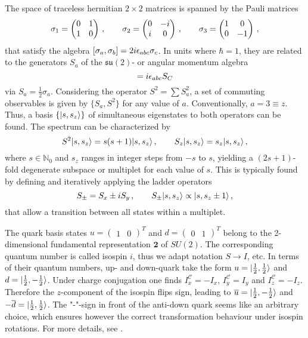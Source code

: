 The space of traceless hermitian $2\times 2$ matrices is spanned by the Pauli matrices
\begin{equation}
    \sigma_1=\begin{pmatrix}
        0&1\\1&0
    \end{pmatrix}\,,\qquad
    \sigma_2=\begin{pmatrix}
        0&-{i}\\{i}&0
    \end{pmatrix}\,,\qquad
    \sigma_3=\begin{pmatrix}
    1&0\\0&-1
    \end{pmatrix}\,,
\end{equation}
that satisfy the algebra ${[\sigma_a,\sigma_b]=2{i}\epsilon_{abc}\sigma_c}$. In units where ${\hbar=1}$, they are related to the generators $S_a$ of the $\mathfrak{su}(2)$- or angular momentum algebra
\begin{equation}
    [S_a,S_b]=\imagu\epsilon_{abc}S_C
\end{equation}
via ${S_a=\frac{1}{2}\sigma_a}$. Considering the operator ${S^2=\sum S_a^2}$, a set of commuting observables is given by ${\{S_a,S^2\}}$ for any value of $a$. Conventionally, ${a=3\equiv z}$. Thus, a basis ${\{{\lvert s,s_z\rangle}\}}$ of simultaneous eigenstates to both operators can be found. The spectrum can be characterized by
\begin{equation}
    S^2{\lvert s,s_z\rangle}=s(s+1){\lvert s,s_z\rangle}\,,\qquad S_z{\lvert s,s_z\rangle}=s_z{\lvert s,s_z\rangle}\,,
\end{equation}
where $s\in\mathbb{N}_0$ and $s_z$ ranges in integer steps from $-s$ to $s$, yielding a ${(2s+1)}$-fold degenerate subspace or multiplet for each value of $s$. This is typically found by defining and iteratively applying the ladder operators
\begin{equation}
    S_\pm=S_x\pm{i} S_y\,,\qquad S_\pm{\lvert s,s_z\rangle}\propto{\lvert s,s_z\pm 1\rangle}\,,
\end{equation}
that allow a transition between all states within a multiplet.

The quark basis states ${u=\begin{pmatrix}1&0\end{pmatrix}^T}$ and ${d=\begin{pmatrix}0&1\end{pmatrix}^T}$ belong to the 2-dimensional fundamental representation $\mathbf{2}$ of $SU(2)$. The corresponding quantum number is called isospin $i$, thus we adapt notation ${S\to I}$, etc. In terms of their quantum numbers, up- and down-quark take the form ${u={\lvert\frac{1}{2},\frac{1}{2}\rangle}}$ and ${d={\lvert\frac{1}{2},-\frac{1}{2}\rangle}}$. Under charge conjugation one finds ${I^\mathcal{C}_x=-I_x}$, ${I^\mathcal{C}_y=I_y}$ and ${I^\mathcal{C}_z=-I_z}$. Therefore the $z$-component of the isospin flips sign, leading to ${\overline{u}={\lvert\frac{1}{2},-\frac{1}{2}\rangle}}$ and ${-\overline{d}={\lvert\frac{1}{2},\frac{1}{2}\rangle}}$. The "-"-sign in front of the anti-down quark seems like an arbitrary choice, which ensures however the correct transformation behaviour under isospin rotations. For more details, see \cite{Thomson_2011}.

